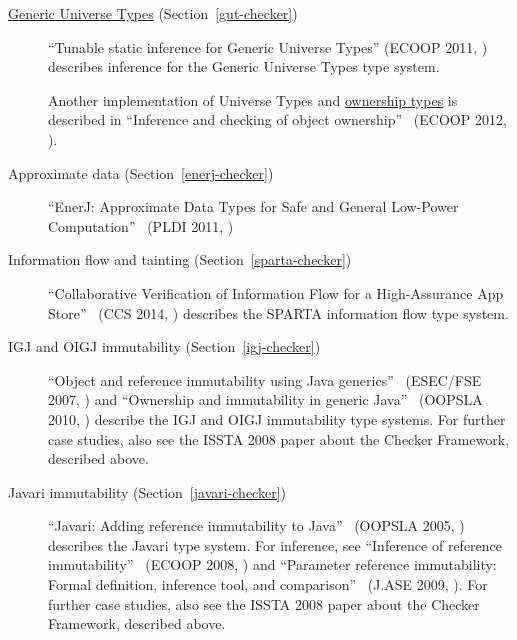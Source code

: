 \begin{description}
\item[\href{https://ece.uwaterloo.ca/~wdietl/ownership/}{Generic Universe
    Types} (Section~\ref{gut-checker})]
``Tunable static inference for Generic Universe Types'' (ECOOP 2011, )
            describes inference for the Generic Universe Types type system.

Another implementation of Universe Types and \href{http://www.cs.rpi.edu/~huangw5/cf-inference/}{ownership types} is  described in
``Inference and checking of object ownership''~\cite{HuangDME2012} (ECOOP 2012, ).

\item[Approximate data (Section~\ref{enerj-checker})]
``EnerJ: Approximate Data Types for Safe and General Low-Power Computation''~\cite{SampsonDFGCG2011} (PLDI 2011, )

\item[Information flow and tainting (Section~\ref{sparta-checker})]
``Collaborative Verification of Information Flow
for a High-Assurance App Store''~\cite{ErnstJMDPRKBBHVW2014} (CCS 2014, ) describes the SPARTA information flow type system.

\item[IGJ and OIGJ immutability (Section~\ref{igj-checker})]
``Object and reference immutability using Java generics''~\cite{ZibinPAAKE2007} (ESEC/FSE 2007, )
and
``Ownership and immutability in generic Java''~\cite{ZibinPLAE2010} (OOPSLA 2010, )
            describe the IGJ and OIGJ immutability type systems.
For further case studies, also see the ISSTA 2008 paper about the Checker
Framework, described above.

\item[Javari immutability (Section~\ref{javari-checker})]
``Javari: Adding reference immutability to Java''~\cite{TschantzE2005} (OOPSLA 2005, )
            describes the Javari type system.
For inference, see
``Inference of reference immutability''~\cite{QuinonezTE2008} (ECOOP 2008, )
and
``Parameter reference immutability: Formal definition, inference tool, and comparison''~\cite{ArtziQKE2009} (J.ASE 2009, ).
For further case studies, also see the ISSTA 2008 paper about the Checker
Framework, described above.


\end{description}
